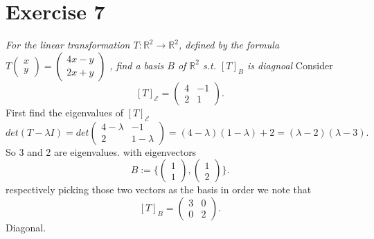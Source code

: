 \documentclass{article}
\begin{document}
    \section{Exercise 7}
    \emph{
        For the linear transformation $T: \mathbb{R}^2 \rightarrow \mathbb{R}^2$, defined by the formula
        $T \begin{pmatrix} x \\ y \end{pmatrix}  = \begin{pmatrix} 4x-y \\ 2x+y \end{pmatrix} $ 
        , find a basis $B$ of $ \mathbb{R}^2$ s.t. $[T]_B$ is diagnoal
    }
    Consider 
    \[
        [T]_\mathcal{E} = \begin{pmatrix} 4 & -1\\ 2 & 1 \end{pmatrix} 
    .\] 
    First find the eigenvalues of $[T]_\mathcal{E}$
    \[
    det(T-\lambda I) = det
    \begin{pmatrix}  4-\lambda & -1\\
    2 & 1 -\lambda\end{pmatrix} = (4-\lambda)(1-\lambda)+2 = (\lambda-2)(\lambda-3)
    .\] 
    So 3 and 2 are eigenvalues. with eigenvectors 
    \[
        B := \{ \begin{pmatrix} 1 \\ 1 \end{pmatrix} , \begin{pmatrix} 1 \\ 2 \end{pmatrix} \}
    .\] 
    respectively
    picking those two vectors as the basis in order we note that 
    \[
        [T]_B = \begin{pmatrix} 
        3 & 0\\
        0 & 2\end{pmatrix} 
    .\] 
    Diagonal.
\end{document}
